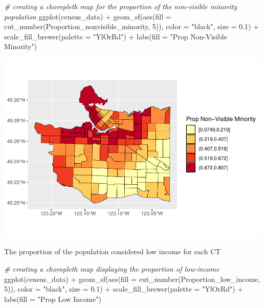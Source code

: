 \documentclass[
]{article}
\newenvironment{Shaded}{\begin{snugshade}}{\end{snugshade}}
\newcommand{\AttributeTok}[1]{\textcolor[rgb]{0.77,0.63,0.00}{#1}}
\newcommand{\CommentTok}[1]{\textcolor[rgb]{0.56,0.35,0.01}{\textit{#1}}}
\newcommand{\DecValTok}[1]{\textcolor[rgb]{0.00,0.00,0.81}{#1}}
\newcommand{\FloatTok}[1]{\textcolor[rgb]{0.00,0.00,0.81}{#1}}
\newcommand{\FunctionTok}[1]{\textcolor[rgb]{0.00,0.00,0.00}{#1}}
\newcommand{\NormalTok}[1]{#1}
\newcommand{\SpecialCharTok}[1]{\textcolor[rgb]{0.00,0.00,0.00}{#1}}
\newcommand{\StringTok}[1]{\textcolor[rgb]{0.31,0.60,0.02}{#1}}
\begin{document}
\begin{Shaded}
\begin{Highlighting}[]
\CommentTok{\# creating a choropleth map for the proportion of the non{-}visible minority population}
\FunctionTok{ggplot}\NormalTok{(census\_data) }\SpecialCharTok{+}
\FunctionTok{geom\_sf}\NormalTok{(}\FunctionTok{aes}\NormalTok{(}\AttributeTok{fill =} \FunctionTok{cut\_number}\NormalTok{(Proportion\_nonvisible\_minority, }\DecValTok{5}\NormalTok{)),}
        \AttributeTok{color =} \StringTok{"black"}\NormalTok{,}
        \AttributeTok{size =} \FloatTok{0.1}\NormalTok{) }\SpecialCharTok{+}
\FunctionTok{scale\_fill\_brewer}\NormalTok{(}\AttributeTok{palette =} \StringTok{"YlOrRd"}\NormalTok{) }\SpecialCharTok{+}
\FunctionTok{labs}\NormalTok{(}\AttributeTok{fill =} \StringTok{"Prop Non{-}Visible Minority"}\NormalTok{)}
\end{Highlighting}
\end{Shaded}

\begin{center}\includegraphics[width=0.8\linewidth]{4GA3Markdown_files/figure-latex/unnamed-chunk-25-1} \end{center}

The proportion of the population considered low income for each CT

\begin{Shaded}
\begin{Highlighting}[]
\CommentTok{\# creating a choropleth map displaying the proportion of low{-}income }
\FunctionTok{ggplot}\NormalTok{(census\_data) }\SpecialCharTok{+}
\FunctionTok{geom\_sf}\NormalTok{(}\FunctionTok{aes}\NormalTok{(}\AttributeTok{fill =} \FunctionTok{cut\_number}\NormalTok{(Proportion\_low\_income, }\DecValTok{5}\NormalTok{)),}
        \AttributeTok{color =} \StringTok{"black"}\NormalTok{,}
        \AttributeTok{size =} \FloatTok{0.1}\NormalTok{) }\SpecialCharTok{+}
\FunctionTok{scale\_fill\_brewer}\NormalTok{(}\AttributeTok{palette =} \StringTok{"YlOrRd"}\NormalTok{) }\SpecialCharTok{+}
\FunctionTok{labs}\NormalTok{(}\AttributeTok{fill =} \StringTok{"Prop Low Income"}\NormalTok{)}
\end{Highlighting}
\end{Shaded}
\end{document}
